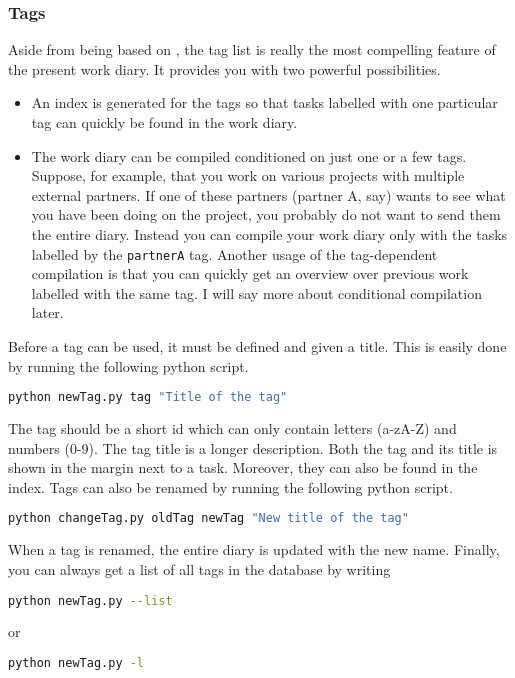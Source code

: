 \subsubsection*{Tags}
Aside from being based on \LaTeXe, the tag list is really the most compelling feature of the present work diary. It provides you with two powerful possibilities.
\begin{itemize}
  \item An index is generated for the tags so that tasks labelled with one particular tag can quickly be found in the work diary.
  \item The work diary can be compiled conditioned on just one or a few tags. Suppose, for example, that you work on various projects with multiple external partners. If one of these partners (partner A, say) wants to see what you have been doing on the project, you probably do not want to send them the entire diary. Instead you can compile your work diary only with the tasks labelled by the {\tt partnerA} tag. Another usage of the tag-dependent compilation is that you can quickly get an overview over previous work labelled with the same tag. I will say more about conditional compilation later.
\end{itemize}
Before a tag can be used, it must be defined and given a title. This is easily done by running the following python script.
\begin{lstlisting}[language=bash]
python newTag.py tag "Title of the tag"
\end{lstlisting}
The tag should be a short id which can only contain letters (a-zA-Z) and numbers (0-9). The tag title is a longer description. Both the tag and its title is shown in the margin next to a task. Moreover, they can also be found in the index. Tags can also be renamed by running the following python script.
\begin{lstlisting}[language=bash]
python changeTag.py oldTag newTag "New title of the tag"
\end{lstlisting}
When a tag is renamed, the entire diary is updated with the new name. Finally, you can always get a list of all tags in the database by writing
\begin{lstlisting}[language=bash]
python newTag.py --list
\end{lstlisting}
or
\begin{lstlisting}[language=bash]
python newTag.py -l
\end{lstlisting}

